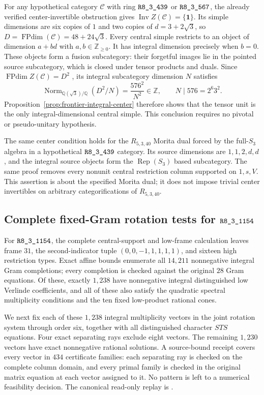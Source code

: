 For any hypothetical category $\mathcal C$ with ring $\sha{R8_3_439}$ or
$\sha{R8_3_567}$, the already verified center-invertible obstruction gives
$\operatorname{Inv}Z(\mathcal C)=\{\mathbf1\}$.
Its simple dimensions are six copies of $1$ and two copies of
$d=3+2\sqrt3$, so $D=\operatorname{FPdim}(\mathcal C)=48+24\sqrt3$.
Every central simple restricts to an object of dimension $a+bd$ with
$a,b\in\mathbb Z_{\geq0}$. It has integral dimension precisely when $b=0$.
These objects form a fusion subcategory: their forgetful images lie in the
pointed source subcategory, which is closed under tensor products and duals.
Since $\operatorname{FPdim}Z(\mathcal C)=D^2$
\cite[Proposition~8.12]{ENO}, its integral subcategory dimension $N$ satisfies
\[
 \operatorname{Norm}_{\mathbb Q(\sqrt3)/\mathbb Q}(D^2/N)
 =\frac{576^2}{N^2}\in\mathbb Z,
 \qquad N\mid576=2^6 3^2.
\]
Proposition~\ref{prop:frontier-integral-center} therefore shows that the tensor
unit is the only integral-dimensional central simple. This conclusion requires
no pivotal or pseudo-unitary hypothesis.

The same center condition holds for the $R_{5,3,40}$ Morita dual forced by
the full-$S_3$ algebra in a hypothetical $\sha{R8_3_439}$ category. Its source
dimensions are $1,1,2,d,d$, and the integral source objects form the
$\operatorname{Rep}(S_3)$ based subcategory. The same proof removes every
nonunit central restriction column supported on $1,s,V$. This assertion is
about the specified Morita dual; it does not impose trivial center invertibles
on arbitrary categorifications of $R_{5,3,40}$.

\subsection{Complete fixed-Gram rotation tests for $\sha{R8_3_1154}$}
\label{subsec:frontier-fixed-gram-1154}

For $\sha{R8_3_1154}$, the complete central-support and low-frame calculation
leaves frame $31$, the second-indicator tuple $(0,0,-1,1,1,1,1)$,
and sixteen high restriction types. Exact affine bounds enumerate all
$14{,}211$ nonnegative integral Gram completions; every completion is
checked against the original $28$ Gram equations. Of these, exactly
$1{,}238$ have nonnegative integral distinguished low Verlinde
coefficients, and all of these also satisfy the quadratic spectral
multiplicity conditions and the ten fixed low-product rational cones.

We next fix each of these $1{,}238$ integral multiplicity vectors in the
joint rotation system through order six, together with all distinguished
character $STS$ equations. Four exact separating rays exclude eight
vectors. The remaining $1{,}230$ vectors have exact nonnegative rational
solutions. A source-bound receipt covers every vector in $434$
certificate families: each separating ray is checked on the complete
column domain, and every primal family is checked in the original
matrix equation at each vector assigned to it. No pattern is left to
a numerical feasibility decision. The canonical read-only replay is
.

